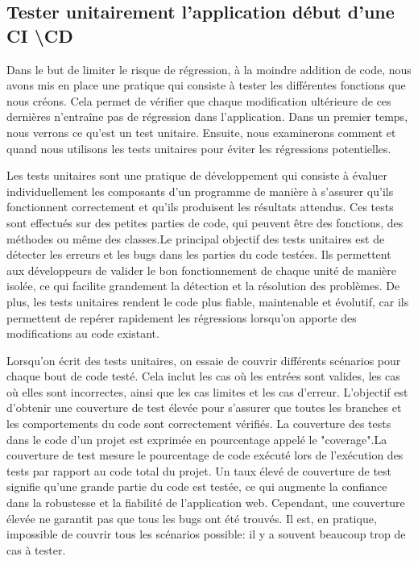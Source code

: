 \documentclass[12pt]{article}
\begin{document}
\subsection{Tester unitairement l'application début d'une CI \textbackslash CD}

\justify
\text 
Dans le but de limiter le risque de régression, à la moindre addition de code, nous avons mis en place une pratique qui consiste à tester les différentes fonctions que nous créons. Cela permet de vérifier que chaque modification ultérieure de ces dernières n'entraîne pas de régression dans l'application. Dans un premier temps, nous verrons ce qu'est un test unitaire. Ensuite, nous examinerons comment et quand nous utilisons les tests unitaires pour éviter les régressions potentielles.

\justify
\text Les tests unitaires sont une pratique de développement  qui consiste à évaluer individuellement les composants d'un programme de manière à s'assurer qu'ils fonctionnent correctement et qu'ils produisent les résultats attendus. Ces tests sont effectués sur des petites parties de code, qui peuvent être des fonctions, des méthodes ou même des classes.Le principal objectif des tests unitaires est de détecter les erreurs et les bugs dans les parties du code testées. Ils permettent aux développeurs de valider le bon fonctionnement de chaque unité de manière isolée, ce qui facilite grandement la détection et la résolution des problèmes. De plus, les tests unitaires rendent le code plus fiable, maintenable et évolutif, car ils permettent de repérer rapidement les régressions lorsqu'on apporte des modifications au code existant.

\justify
\text Lorsqu'on écrit des tests unitaires, on essaie de couvrir différents scénarios pour chaque bout de code testé. Cela inclut les cas où les entrées sont valides, les cas où elles sont incorrectes, ainsi que les cas limites et les cas d'erreur. L'objectif est d'obtenir une couverture de test élevée pour s'assurer que toutes les branches et les comportements du code sont correctement vérifiés. La couverture des tests dans le code d'un projet est exprimée en pourcentage appelé le "coverage".La couverture de test mesure le pourcentage de code exécuté lors de l'exécution des tests par rapport au code total du projet. Un taux élevé de couverture de test signifie qu'une grande partie du code est testée, ce qui augmente la confiance dans la robustesse et la fiabilité de l'application web. Cependant, une couverture élevée ne garantit pas que tous les bugs ont été trouvés. Il est, en pratique, impossible de couvrir tous les scénarios possible: il y a souvent beaucoup trop de cas à tester.
\end{document}
